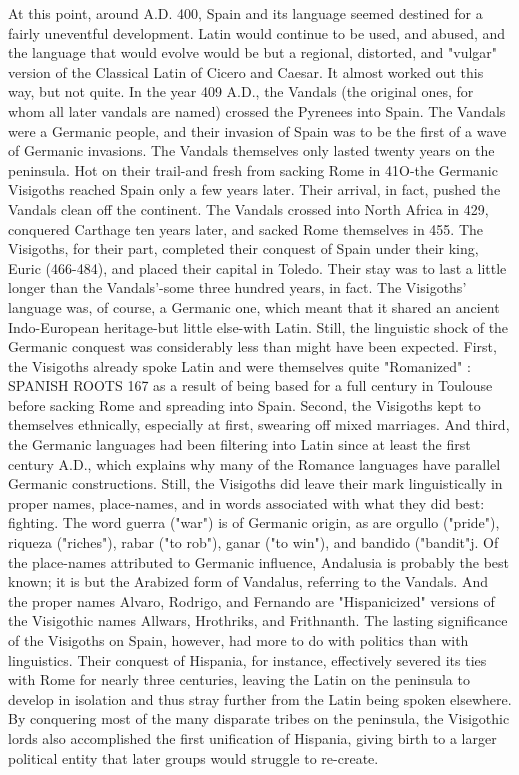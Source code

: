 At this point, around A.D. 400, Spain and its language seemed
destined for a fairly uneventful development. Latin would continue to
be used, and abused, and the language that would evolve would be but
a regional, distorted, and "vulgar" version of the Classical Latin of
Cicero and Caesar.
It almost worked out this way, but not quite. In the year
409 A.D., the Vandals (the original ones, for whom all later vandals are
named) crossed the Pyrenees into Spain. The Vandals were a Germanic
people, and their invasion of Spain was to be the first of a wave of Germanic invasions. The Vandals themselves only lasted twenty years
on the peninsula. Hot on their trail-and fresh from sacking Rome in
41O-the Germanic Visigoths reached Spain only a few years later.
Their arrival, in fact, pushed the Vandals clean off the continent. The
Vandals crossed into North Africa in 429, conquered Carthage ten
years later, and sacked Rome themselves in 455. The Visigoths, for
their part, completed their conquest of Spain under their king, Euric
(466-484), and placed their capital in Toledo. Their stay was to last a
little longer than the Vandals'-some three hundred years, in fact.
The Visigoths' language was, of course, a Germanic one,
which meant that it shared an ancient Indo-European heritage-but
little else-with Latin. Still, the linguistic shock of the Germanic conquest was considerably less than might have been expected. First, the
Visigoths already spoke Latin and were themselves quite "Romanized" :
SPANISH ROOTS 167
as a result of being based for a full century in Toulouse before sacking
Rome and spreading into Spain. Second, the Visigoths kept to themselves ethnically, especially at first, swearing off mixed marriages. And
third, the Germanic languages had been filtering into Latin since at
least the first century A.D., which explains why many of the Romance
languages have parallel Germanic constructions.
Still, the Visigoths did leave their mark linguistically in proper
names, place-names, and in words associated with what they did best:
fighting. The word guerra ("war") is of Germanic origin, as are orgullo
("pride"), riqueza ("riches"), rabar ("to rob"), ganar ("to win"), and
bandido ("bandit"j. Of the place-names attributed to Germanic influence, Andalusia is probably the best known; it is but the Arabized
form of Vandalus, referring to the Vandals. And the proper names Alvaro, Rodrigo, and Fernando are "Hispanicized" versions of the Visigothic names Allwars, Hrothriks, and Frithnanth.
The lasting significance of the Visigoths on Spain, however,
had more to do with politics than with linguistics. Their conquest of
Hispania, for instance, effectively severed its ties with Rome for nearly
three centuries, leaving the Latin on the peninsula to develop in isolation and thus stray further from the Latin being spoken elsewhere. By
conquering most of the many disparate tribes on the peninsula, the
Visigothic lords also accomplished the first unification of Hispania,
giving birth to a larger political entity that later groups would struggle
to re-create.

